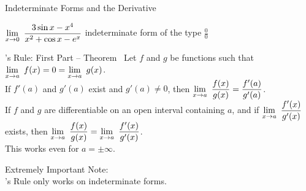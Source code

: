 \begin{frame}[t]{Indeterminate Forms and the Derivative}


$\displaystyle\displaystyle\lim_{x \to 0}~\dfrac{3\sin x -x^4}{x^2+\cos x -e^x}$ \hfill\textcolor{M4}{indeterminate form of the type $\frac{0}{0}$}\\ \vfill \color{answercolor}

 

\vfill
\end{frame}
\begin{frame}[t]%
\begin{block}{\hosp's Rule: First Part -- Theorem~}
Let $f$ and $g$ be functions such that  $\displaystyle\lim_{x \to a}~ f(x)  = 0 = \displaystyle\lim_{x \to a}~g(x)$.\\[1em]


If $f'(a)$ and $g'(a)$ exist and $g'(a) \neq 0$, then
\textcolor{M3}{$\displaystyle\lim_{x \to a}~\frac{f(x)}{g(x)} =\frac{f'(a)}{g'(a)}$}.\\[2em]


If $f$ and $g$ are differentiable on an open interval containing $a$, and if $\displaystyle\displaystyle\lim_{x \to a}~ \dfrac{f'(x)}{g'(x)}$ exists, then
\textcolor{C1}{$\displaystyle\lim_{x \to a}~\frac{f(x)}{g(x)} =\displaystyle\lim_{x \to a}~\frac{f'(x)}{g'(x)}$}.\\[1em]

This works even for $a = \pm \infty$.
\end{block}
\vfill

\color{M4} Extremely Important Note:\\ \hosp's Rule only works on indeterminate forms.
\end{frame}
